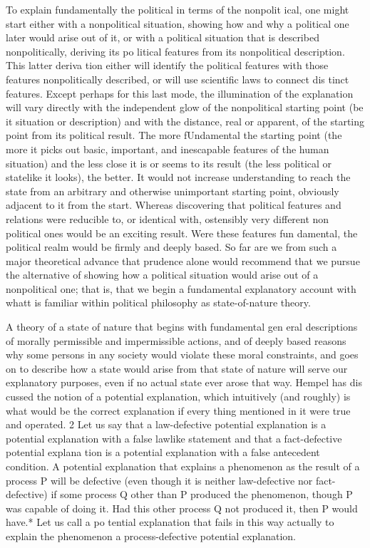 \documentclass[11pt,openany]{book}
\begin{document}
To explain fundamentally the political in terms of the nonpolit ical, one might start either with a nonpolitical situation, showing how and why a political one later would arise out of it, or with a political situation that is described nonpolitically, deriving its po litical features from its nonpolitical description. This latter deriva tion either will identify the political features with those features nonpolitically described, or will use scientific laws to connect dis tinct features. Except perhaps for this last mode, the illumination of the explanation will vary directly with the independent glow of the nonpolitical starting point (be it situation or description) and with the distance, real or apparent, of the starting point from its political result. The more fUndamental the starting point (the more it picks out basic, important, and inescapable features of the human situation) and the less close it is or seems to its result (the less political or statelike it looks), the better. It would not increase understanding to reach the state from an arbitrary and otherwise unimportant starting point, obviously adjacent to it from the start. Whereas discovering that political features and relations were reducible to, or identical with, ostensibly very different non political ones would be an exciting result. Were these features fun damental, the political realm would be firmly and deeply based. So far are we from such a major theoretical advance that prudence alone would recommend that we pursue the alternative of showing how a political situation would arise out of a nonpolitical one; that is, that we begin a fundamental explanatory account with whatt is familiar within political philosophy as state-of-nature theory. 

A theory of a state of nature that begins with fundamental gen eral descriptions of morally permissible and impermissible actions, and of deeply based reasons why some persons in any society would violate these moral constraints, and goes on to describe how a state would arise from that state of nature will serve our explanatory purposes, even if no actual state ever arose that way. Hempel has dis cussed the notion of a potential explanation, which intuitively (and roughly) is what would be the correct explanation if every thing mentioned in it were true and operated. 2 Let us say that a law-defective potential explanation is a potential explanation with a false lawlike statement and that a fact-defective potential explana tion is a potential explanation with a false antecedent condition. A potential explanation that explains a phenomenon as the result of a process P will be defective (even though it is neither law-defective nor fact-defective) if some process Q other than P produced the phenomenon, though P was capable of doing it. Had this other process Q not produced it, then P would have.* Let us call a po tential explanation that fails in this way actually to explain the phenomenon a process-defective potential explanation. 
\end{document}
